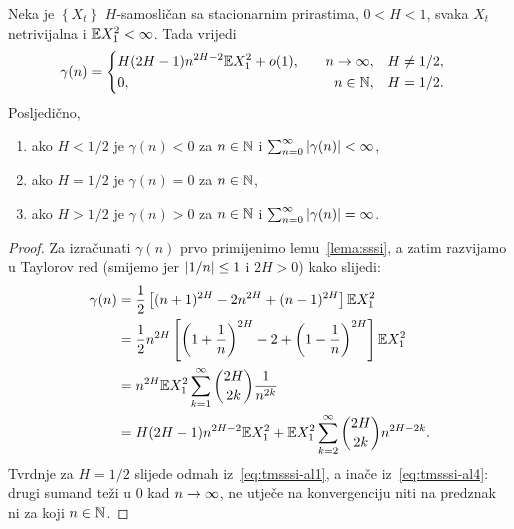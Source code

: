 \documentclass[main.tex]{subfiles}
\begin{document}
\begin{teorem} \label{tm:sssi}
	Neka je \( \left\{ X_t \right\} \) \( H \)-samosličan sa stacionarnim prirastima, \( 0 < H < 1 \),
	svaka \( X_t \) netrivijalna i \( \mathbb{E} X_1^2 < \infty \). Tada vrijedi
	\begin{equation}
		\gamma(n)=  \begin{cases}\begin{aligned}
				 & H(2H-1)n^{2H-2}\mathbb{E} X_1^2 + o(1), & \quad n \rightarrow \infty,    & \quad H\neq 1/2, \\
				 & 0,                              & \quad n \in \mathbb{N}, & \quad H=1/2.
			\end{aligned}\end{cases}
	\end{equation}
	Posljedično,
	\begin{enumerate}[label=(\roman*)]
		\item ako \( H < 1/2 \) je \( \gamma(n) < 0 \) za \( n \in \mathbb{N} \) i \( \sum_{n=0}^\infty \left| {\gamma(n)} \right| < \infty \),
		\item ako \( H=1/2 \) je \( \gamma(n)=0 \) za \( n \in \mathbb{N} \),
		\item ako \( H>1/2 \) je \( \gamma(n) > 0\) za \( n \in \mathbb{N} \) i  \( \sum_{n=0}^\infty \left| {\gamma(n)} \right| = \infty \).
	\end{enumerate}
\end{teorem}

\begin{proof}
	Za izračunati \( \gamma(n) \) prvo primijenimo lemu~\ref{lema:sssi}, a zatim
	razvijamo u Taylorov red (smijemo jer \( \left| {1/n} \right| \le 1 \) i \( 2H > 0 \)) kako slijedi:
	\begin{align}
		\gamma(n) & = \frac 12 \left[ (n+1)^{2H} - 2n^{2H} + (n-1)^{2H} \right] \mathbb{E} X_1^2                                          \label{eq:tmsssi-al1} \\
		          & = \frac 12 n^{2H} \left[ \left( 1+\frac 1n \right)^{2H} - 2 + \left( 1-\frac 1n \right)^{2H} \right] \mathbb{E} X_1^2                       \\
		          & = n^{2H} \mathbb{E} X_1^2 \sum_{k=1}^\infty \binom{2H}{2k} \frac 1{n^{2k}}                                                                  \\
		          & = H(2H-1)n^{2H-2}\mathbb{E} X_1^2 + \mathbb{E} X_1^2 \sum_{k=2}^\infty \binom{2H}{2k}n^{2H-2k}.\label{eq:tmsssi-al4}
	\end{align}
	Tvrdnje za \( H=1/2 \) slijede odmah iz~\eqref{eq:tmsssi-al1}, a inače iz~\eqref{eq:tmsssi-al4}: drugi sumand teži u \( 0 \) kad \( n \rightarrow \infty \), ne utječe na konvergenciju niti na
	predznak ni za koji \( n \in \mathbb{N} \).

\end{proof}
\end{document}
